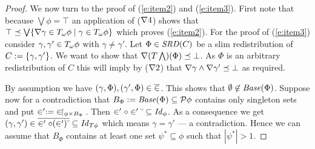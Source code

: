\documentclass{book}
\begin{document}
\begin{proof}
We now turn to the proof of (\ref{e:item2}) and (\ref{e:item3}). 
First note that because $\bigvee \phi = \top$ an application
of ($\nabla 4$) shows that $\top \preceq \bigvee 
\{ \nabla\gamma \in T_{\omega} \phi \mid \gamma \in T_{\omega} \phi\} $
which proves (\ref{e:item2}).
% 
% 
For the proof of (\ref{e:item3}) consider $\gamma,\gamma' \in T_{\omega} \phi$ 
with $\gamma \not= \gamma'$.  
Let $\Phi \in \mathit{SRD}(C)$ be a slim redistribution of 
$C \mathrel{:=} \{\gamma,\gamma'\}$. We want to show that
$\nabla(T \bigwedge)(\Phi) \preceq \bot$. As $\Phi$ is an arbitrary redistribution of $C$ this will imply by ($\nabla 2$) that
$\nabla \gamma \wedge \nabla \gamma' \preceq \bot$ as required.

By assumption we have $(\gamma,\Phi), (\gamma',\Phi) \in \overline{\in}$.
This shows that $\emptyset \not\in\mathit{Base}(\Phi)$. 
Suppose now for a contradiction that $B_\Phi \mathrel{:=} 
\mathit{Base}(\Phi) \subseteq \mathcal{P} \phi$ contains only singleton sets
and put $\in' \mathrel{:=} {\in\!\upharpoonright_{\phi \times B_\Phi}\,}$.
Then $\in' \circ \in'\breve{\hspace*{1mm}} \subseteq \mathit{Id}_{\phi}$.
As a consequence we get $(\gamma,\gamma') \in \overline{\in' \circ (\in')\breve{\hspace*{1mm}}}
\subseteq \mathit{Id}_{T\phi}$ which means $\gamma = \gamma'$ --- a contradiction.
Hence we can assume that $B_\Phi$ contains at least one set 
$\psi^* \subseteq \phi$ such that $|\psi^*|>1$.


\end{proof}
\end{document}
